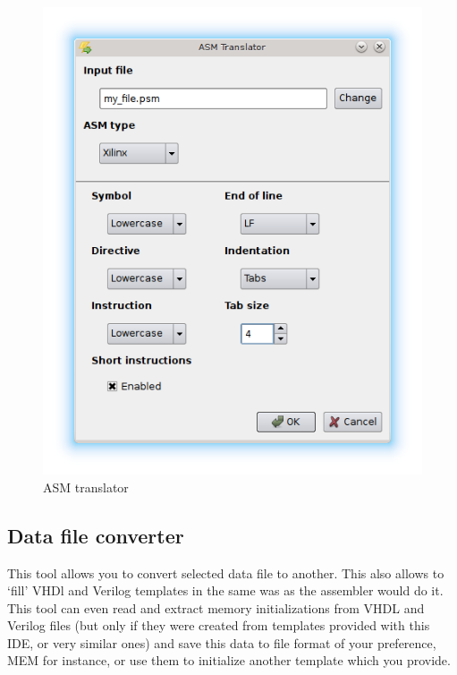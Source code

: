         \begin{figure}[h]
            \centering
            \includegraphics[width=.5\textwidth]{img/ASM_translator.png}
            \caption{ASM translator}
        \end{figure}

    \clearpage
    \subsection{Data file converter}
        This tool allows you to convert selected data file to another. This also allows to `fill' VHDl and Verilog templates in the same was as the assembler would do it. This tool can even read and extract memory initializations from VHDL and Verilog files (but only if they were created from templates provided with this IDE, or very similar ones) and save this data to file format of your preference, MEM for instance, or use them to initialize another template which you provide.

